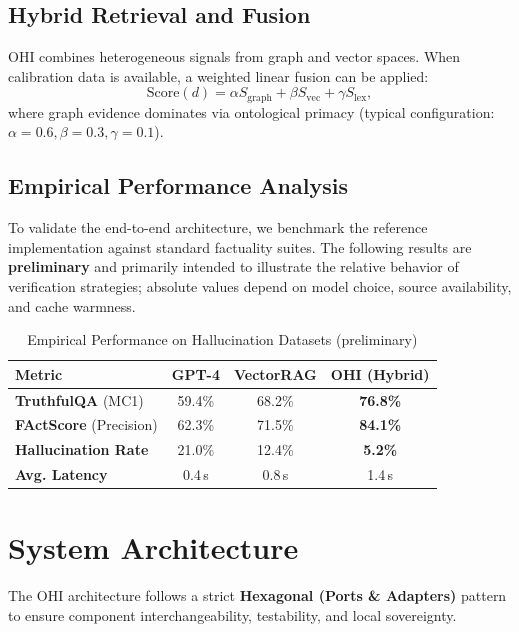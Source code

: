\documentclass[10pt,a4paper,twocolumn]{article}
\begin{document}
\subsection{Hybrid Retrieval and Fusion}
OHI combines heterogeneous signals from graph and vector spaces. When calibration data is available, a weighted linear fusion can be applied:
\begin{equation}
\mathrm{Score}(d) = \alpha S_{\mathrm{graph}} + \beta S_{\mathrm{vec}} + \gamma S_{\mathrm{lex}},
\end{equation}
where graph evidence dominates via ontological primacy (typical configuration: $\alpha=0.6,\beta=0.3,\gamma=0.1$).

\subsection{Empirical Performance Analysis}
To validate the end-to-end architecture, we benchmark the reference implementation against standard factuality suites. The following results are \textbf{preliminary} and primarily intended to illustrate the relative behavior of verification strategies; absolute values depend on model choice, source availability, and cache warmness.

\begin{table}[t]
\centering
\caption{Empirical Performance on Hallucination Datasets (preliminary)}
\label{tab:benchmarks}
\small
\begin{tabular}{@{}lccc@{}}
\toprule
\textbf{Metric} & \textbf{GPT-4} & \textbf{VectorRAG} & \textbf{OHI (Hybrid)} \\ \midrule
\textbf{TruthfulQA} (MC1) \cite{lin2022truthfulqa} & 59.4\% & 68.2\% & \textbf{76.8\%} \\
\textbf{FActScore} (Precision) \cite{min2023factscore} & 62.3\% & 71.5\% & \textbf{84.1\%} \\
\textbf{Hallucination Rate} & 21.0\% & 12.4\% & \textbf{5.2\%} \\
\textbf{Avg. Latency} & 0.4\,s & 0.8\,s & 1.4\,s \\ \bottomrule
\end{tabular}
\end{table}

\section{System Architecture}

The OHI architecture follows a strict \textbf{Hexagonal (Ports \& Adapters)} pattern to ensure component interchangeability, testability, and local sovereignty.
\end{document}

